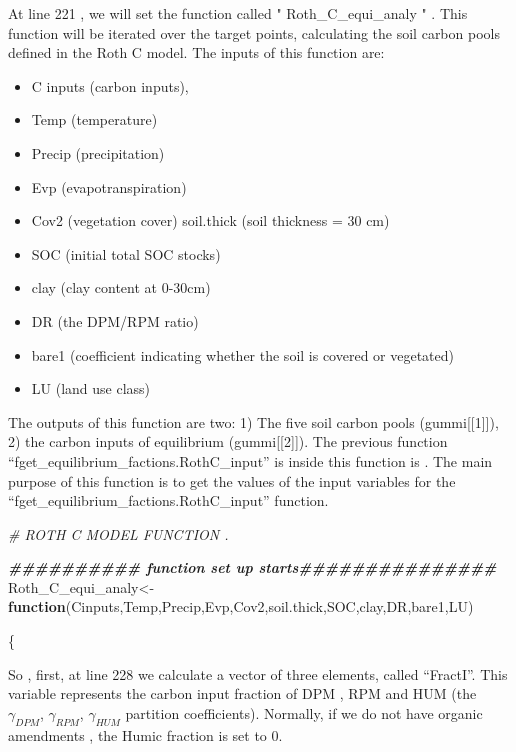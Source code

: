 \documentclass[
  10pt,
  b5paper,
]{book}
\newenvironment{Shaded}{\begin{snugshade}}{\end{snugshade}}
\newcommand{\CommentTok}[1]{\textcolor[rgb]{0.56,0.35,0.01}{\textit{#1}}}
\newcommand{\ControlFlowTok}[1]{\textcolor[rgb]{0.13,0.29,0.53}{\textbf{#1}}}
\newcommand{\DocumentationTok}[1]{\textcolor[rgb]{0.56,0.35,0.01}{\textbf{\textit{#1}}}}
\newcommand{\NormalTok}[1]{#1}
\newcommand{\OtherTok}[1]{\textcolor[rgb]{0.56,0.35,0.01}{#1}}
\providecommand{\tightlist}{%
  \setlength{\itemsep}{0pt}\setlength{\parskip}{0pt}}
\begin{document}
At line 221 , we will set the function called " Roth\_C\_equi\_analy " . This function will be iterated over the target points, calculating the soil carbon pools defined in the Roth C model. The inputs of this function are:

\begin{itemize}
\tightlist
\item
  C inputs (carbon inputs),
\item
  Temp (temperature)
\item
  Precip (precipitation)
\item
  Evp (evapotranspiration)
\item
  Cov2 (vegetation cover)
  soil.thick (soil thickness = 30 cm)
\item
  SOC (initial total SOC stocks)
\item
  clay (clay content at 0-30cm)
\item
  DR (the DPM/RPM ratio)
\item
  bare1 (coefficient indicating whether the soil is covered or vegetated)
\item
  LU (land use class)
\end{itemize}

The outputs of this function are two: 1) The five soil carbon pools (gummi{[}{[}1{]}{]}), 2) the carbon inputs of equilibrium (gummi{[}{[}2{]}{]}). The previous function ``fget\_equilibrium\_factions.RothC\_input'' is inside this function is . The main purpose of this function is to get the values of the input variables for the ``fget\_equilibrium\_factions.RothC\_input'' function.

\begin{Shaded}
\begin{Highlighting}[]
\CommentTok{\# ROTH C MODEL FUNCTION . }

\DocumentationTok{\#\#\#\#\#\#\#\#\#\# function set up starts\#\#\#\#\#\#\#\#\#\#\#\#\#\#\#}
\NormalTok{Roth\_C\_equi\_analy}\OtherTok{\textless{}{-}}\ControlFlowTok{function}\NormalTok{(Cinputs,Temp,Precip,Evp,Cov2,soil.thick,SOC,clay,DR,bare1,LU)}
  
\NormalTok{\{}
\end{Highlighting}
\end{Shaded}

So , first, at line 228 we calculate a vector of three elements, called ``FractI''. This variable represents the carbon input fraction of DPM , RPM and HUM (the \(\gamma_{DPM}\), \(\gamma_{RPM}\), \(\gamma_{HUM}\) partition coefficients). Normally, if we do not have organic amendments , the Humic fraction is set to 0.
\end{document}
